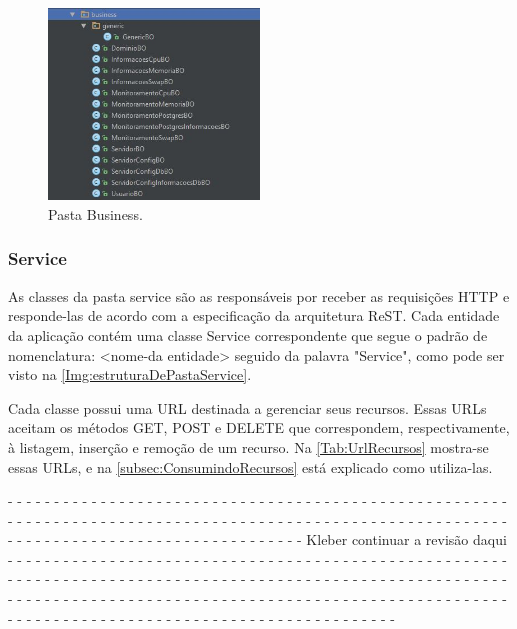 \begin{figure}[H]
	\centering
	\includegraphics[width=0.5\textwidth]{figuras/estruturaPojetoBusines.JPG}
	\caption[Pasta Business.]{Pasta Business.}
	\label{Img:estruturaDePastaBusiness}
\end{figure}



\subsubsection{Service}\label{subsubsec:Service}

As classes da pasta service são as responsáveis por receber as requisições HTTP e responde-las de acordo com a especificação da arquitetura ReST. Cada entidade da aplicação contém uma classe Service correspondente que segue o padrão de nomenclatura: <nome-da entidade> seguido da palavra "Service", como pode ser visto na \autoref{Img:estruturaDePastaService}.

Cada classe possui uma URL destinada a gerenciar seus recursos. Essas URLs aceitam os métodos GET, POST e DELETE que correspondem, respectivamente, à listagem, inserção e remoção de um recurso. Na \autoref{Tab:UrlRecursos} mostra-se essas URLs, e na \autoref{subsec:ConsumindoRecursos} está explicado como utiliza-las.


- - - - - - - - - - - - - - - - - - - - - - - - - - - - - - - - - - - - - - - - - - - - - - - - - - - - - - - - - - - - 
- - - - - - - - - - - - - - - - - - - - - - - - - - - - - - - - - - - - - - - - - - - - - - - - - - - - - - - - - - - - 
- - - - - - - - - - - - - - - - - - - - Kleber continuar a revisão daqui - - - - - - - - - - - - - - - - - - - - - - - -
- - - - - - - - - - - - - - - - - - - - - - - - - - - - - - - - - - - - - - - - - - - - - - - - - - - - - - - - - - - - 
- - - - - - - - - - - - - - - - - - - - - - - - - - - - - - - - - - - - - - - - - - - - - - - - - - - - - - - - - - - - 
- - - - - - - - - - - - - - - - - - - - - - - - - - - - - - - - - - - - - - - - - - - - - - - - - - - - - - - - - - - - 


